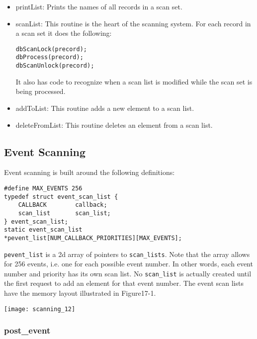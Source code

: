 \begin{itemize}
\item printList:  Prints the names of all records in a scan set.

\item scanList:  This routine is the heart of the scanning system. For each record in a scan set it does the following:

\begin{verbatim}
dbScanLock(precord);
dbProcess(precord);
dbScanUnlock(precord);
\end{verbatim}

It also has code to recognize when a scan list is modified while the scan set is being processed.

\item addToList:  This routine adds a new element to a scan list.

\item deleteFromList:  This routine deletes an element from a scan list.

\end{itemize}

\subsection{Event Scanning}

Event scanning is built around the following definitions:

\begin{verbatim}
#define MAX_EVENTS 256
typedef struct event_scan_list {
    CALLBACK        callback;
    scan_list       scan_list;
} event_scan_list;
static event_scan_list
*pevent_list[NUM_CALLBACK_PRIORITIES][MAX_EVENTS];
\end{verbatim}

\verb|pevent_list| is a 2d array of pointers to \verb|scan_lists|. Note that the array allows for 256 events, i.e. one for each 
possible event number. In other words, each event number and priority has its own scan list. No \verb|scan_list| is actually 
created until the first request to add an element for that event number. The event scan lists have the memory layout 
illustrated in Figure17-1.

\begin{center}
\texttt{[image: scanning\_12]}
\end{center}

\subsubsection{post\_event} 

